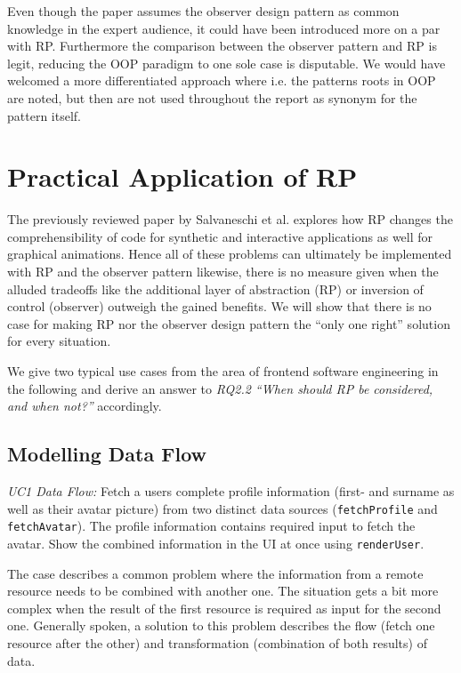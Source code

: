 \documentclass[12pt,a4paper]{article}
\begin{document}
Even though the paper assumes the observer design pattern as common knowledge in the expert audience, it could have been introduced more on a par with RP. Furthermore the comparison between the observer pattern and RP is legit, reducing the OOP paradigm to one sole case is disputable. We would have welcomed a more differentiated approach where i.e. the patterns roots in OOP are noted, but then are not used throughout the report as synonym for the pattern itself.

\section{Practical Application of RP}

The previously reviewed paper by Salvaneschi et al. explores how RP changes the comprehensibility of code for synthetic and interactive applications as well for graphical animations. Hence all of these problems can ultimately be implemented with RP and the observer pattern likewise, there is no measure given when the alluded tradeoffs like the additional layer of abstraction (RP) or inversion of control (observer) outweigh the gained benefits. We will show that there is no case for making RP nor the observer design pattern the ``only one right'' solution for every situation.

We give two typical use cases from the area of frontend software engineering in the following and derive an answer to \emph{RQ2.2 ``When should RP be considered, and when not?''} accordingly.

\subsection{Modelling Data Flow}

\begin{framed}
	\noindent\emph{UC1 Data Flow:} Fetch a users complete profile information (first- and surname as well as their avatar picture) from two distinct data sources (\texttt{fetchProfile} and \texttt{fetchAvatar}). The profile information contains required input to fetch the avatar. Show the combined information in the UI at once using \texttt{renderUser}.
\end{framed}

The case describes a common problem where the information from a remote resource needs to be combined with another one. The situation gets a bit more complex when the result of the first resource is required as input for the second one. Generally spoken, a solution to this problem describes the flow (fetch one resource after the other) and transformation (combination of both results) of data.
\end{document}
